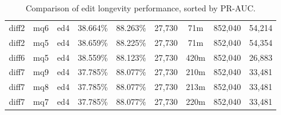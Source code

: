 \begin{sidewaystable}[!ph]
\begin{center}
\begin{tabular}{|c|c|c||c|c||c|c|c|c|}
diff2 & mq6 & ed4 & 38.664\% & 88.263\% & 27,730 & 71m & 852,040 & 54,214 \\
diff2 & mq5 & ed4 & 38.659\% & 88.225\% & 27,730 & 71m & 852,040 & 54,354 \\
diff6 & mq5 & ed4 & 38.559\% & 88.123\% & 27,730 & 420m & 852,040 & 26,883 \\
diff7 & mq9 & ed4 & 37.785\% & 88.077\% & 27,730 & 210m & 852,040 & 33,481 \\
diff7 & mq8 & ed4 & 37.785\% & 88.077\% & 27,730 & 213m & 852,040 & 33,481 \\
diff7 & mq7 & ed4 & 37.785\% & 88.077\% & 27,730 & 220m & 852,040 & 33,481 \\
\hline
\end{tabular}
\end{center}
\caption{Comparison of edit longevity performance,
    sorted by PR-AUC.}
\label{tab:editshoutI}
\end{sidewaystable}
\clearpage
